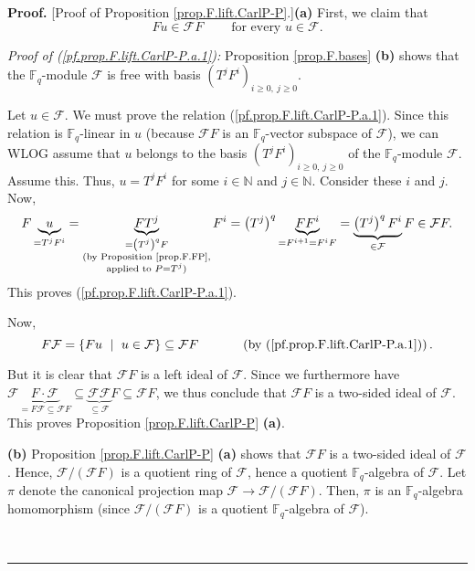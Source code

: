 \documentclass[numbers=enddot,12pt,final,onecolumn,notitlepage]{scrartcl}%
\theoremstyle{definition}
\newenvironment{proof}[1][Proof]{\noindent\textbf{#1.} }{\ \rule{0.5em}{0.5em}}
\begin{document}
\begin{proof}
[Proof of Proposition \ref{prop.F.lift.CarlP-P}.]\textbf{(a)} First, we claim
that%
\begin{equation}
Fu\in\mathcal{F}F\ \ \ \ \ \ \ \ \ \ \text{for every }u\in\mathcal{F}.
\label{pf.prop.F.lift.CarlP-P.a.1}%
\end{equation}


\textit{Proof of (\ref{pf.prop.F.lift.CarlP-P.a.1}):} Proposition
\ref{prop.F.bases} \textbf{(b)} shows that the $\mathbb{F}_{q}$-module
$\mathcal{F}$ is free with basis $\left(  T^{j}F^{i}\right)  _{i\geq
0,\ j\geq0}$.

Let $u\in\mathcal{F}$. We must prove the relation
(\ref{pf.prop.F.lift.CarlP-P.a.1}). Since this relation is $\mathbb{F}_{q}%
$-linear in $u$ (because $\mathcal{F}F$ is an $\mathbb{F}_{q}$-vector subspace
of $\mathcal{F}$), we can WLOG assume that $u$ belongs to the basis $\left(
T^{j}F^{i}\right)  _{i\geq0,\ j\geq0}$ of the $\mathbb{F}_{q}$-module
$\mathcal{F}$. Assume this. Thus, $u=T^{j}F^{i}$ for some $i\in\mathbb{N}$ and
$j\in\mathbb{N}$. Consider these $i$ and $j$. Now,%
\[
F\underbrace{u}_{=T^{j}F^{i}}=\underbrace{FT^{j}}_{\substack{=\left(
T^{j}\right)  ^{q}F\\\text{(by Proposition \ref{prop.F.FP},}\\\text{applied to
}P=T^{j}\text{)}}}F^{i}=\left(  T^{j}\right)  ^{q}\underbrace{FF^{i}%
}_{=F^{i+1}=F^{i}F}=\underbrace{\left(  T^{j}\right)  ^{q}F^{i}}%
_{\in\mathcal{F}}F\in\mathcal{F}F.
\]
This proves (\ref{pf.prop.F.lift.CarlP-P.a.1}).

Now,
\[
F\mathcal{F}=\left\{  Fu\ \mid\ u\in\mathcal{F}\right\}  \subseteq
\mathcal{F}F\ \ \ \ \ \ \ \ \ \ \left(  \text{by
(\ref{pf.prop.F.lift.CarlP-P.a.1})}\right)  .
\]


But it is clear that $\mathcal{F}F$ is a left ideal of $\mathcal{F}$. Since we
furthermore have $\mathcal{F}\underbrace{F\cdot\mathcal{F}}_{=F\mathcal{F}%
\subseteq\mathcal{F}F}\subseteq\underbrace{\mathcal{FF}}_{\subseteq
\mathcal{F}}F\subseteq\mathcal{F}F$, we thus conclude that $\mathcal{F}F$ is a
two-sided ideal of $\mathcal{F}$. This proves Proposition
\ref{prop.F.lift.CarlP-P} \textbf{(a)}.

\textbf{(b)} Proposition \ref{prop.F.lift.CarlP-P} \textbf{(a)} shows that
$\mathcal{F}F$ is a two-sided ideal of $\mathcal{F}$. Hence, $\mathcal{F}%
/\left(  \mathcal{F}F\right)  $ is a quotient ring of $\mathcal{F}$, hence a
quotient $\mathbb{F}_{q}$-algebra of $\mathcal{F}$. Let $\pi$ denote the
canonical projection map $\mathcal{F}\rightarrow\mathcal{F}/\left(
\mathcal{F}F\right)  $. Then, $\pi$ is an $\mathbb{F}_{q}$-algebra
homomorphism (since $\mathcal{F}/\left(  \mathcal{F}F\right)  $ is a quotient
$\mathbb{F}_{q}$-algebra of $\mathcal{F}$).


\end{proof}
\end{document}
